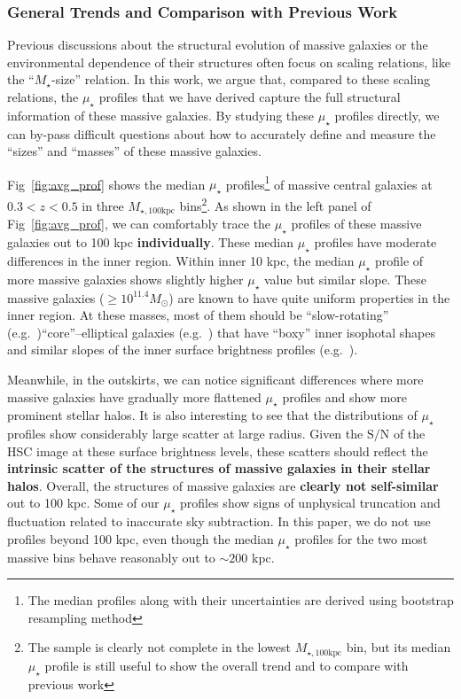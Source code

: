 \documentclass[a4paper,fleqn,usenatbib]{mnras}
\def\mstar{{$M_{\star}$}}
\def\mtot{{$M_{\star,100\mathrm{kpc}}$}}
\def\s2n{{$\mathrm{S}/\mathrm{N}$}}
\def\mden{{$\mu_{\star}$}}
\begin{document}
\subsubsection{General Trends and Comparison with Previous Work}
    \label{sssec:sbp_inter}
          
    Previous discussions about the structural evolution of massive galaxies or the 
    environmental dependence of their structures often focus on scaling relations,  
    like the ``\mstar{}-size'' relation. 
    In this work, we argue that, compared to these scaling relations, the \mden{} 
    profiles that we have derived capture the full structural information of these 
    massive galaxies.
    By studying these \mden{} profiles directly, we can by-pass difficult questions 
    about how to accurately define and measure the ``sizes'' and ``masses'' of these 
    massive galaxies. 
    
    Fig~\ref{fig:avg_prof} shows the median \mden{} profiles\footnote{The median 
    profiles along with their uncertainties are derived using bootstrap resampling 
    method} of massive central galaxies at $0.3 < z < 0.5$ in three \mtot{} 
    bins\footnote{The sample is clearly not complete in the lowest \mtot{} bin, 
    but its median \mden{} profile is still useful to show the overall trend and to 
    compare with previous work}. 
    As shown in the left panel of Fig~\ref{fig:avg_prof}, we can comfortably trace
    the \mden{} profiles of these massive galaxies out to 100 kpc 
    \textbf{individually}. 
    These median \mden{} profiles have moderate differences in the inner region. 
    Within inner 10 kpc, the median \mden{} profile of more massive galaxies 
    shows slightly higher \mden{} value but similar slope. 
    These massive galaxies ($\ge 10^{11.4} M_{\odot}$) are known to have quite 
    uniform properties in the inner region. 
    At these masses, most of them should be ``slow-rotating'' 
    (e.g.\ \citealt{Cappellari13b})``core''--elliptical galaxies 
    (e.g.\ \citealt{Lauer07}) that have ``boxy'' inner isophotal shapes and similar 
    slopes of the inner surface brightness profiles (e.g.\ \citealt{Kormendy2009,
    Schombert2015}).
    
    Meanwhile, in the outskirts, we can notice significant differences where more 
    massive galaxies have gradually more flattened \mden{} profiles and show more 
    prominent stellar halos.
    It is also interesting to see that the distributions of \mden{} profiles show 
    considerably large scatter at large radius. 
    Given the \s2n{} of the HSC image at these surface brightness levels, these 
    scatters should reflect the \textbf{intrinsic scatter of the structures of 
    massive galaxies in their stellar halos}.
    Overall, the structures of massive galaxies are \textbf{clearly not 
    self-similar} out to 100 kpc. 
    Some of our \mden{} profiles show signs of unphysical truncation and fluctuation 
    related to inaccurate sky subtraction. 
    In this paper, we do not use profiles beyond 100 kpc, even though the median 
    \mden{} profiles for the two most massive bins behave reasonably out to 
    ${\sim} 200$ kpc. 
    
\end{document}

